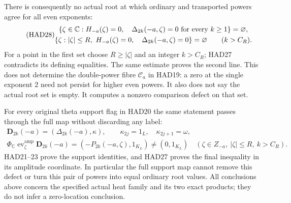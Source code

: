 There is consequently no actual root at which ordinary
and transported powers agree for all even exponents:
\begin{equation}\tag{HAD28}
\begin{gathered}
 \left\{\zeta\in\mathbb C:H_{-a}(\zeta)=0,\quad
          \Delta_{2k}(-a,\zeta)=0\ \hbox{for every }k\ge1\right\}
          =\varnothing,\\
 \left\{\zeta:|\zeta|\le R,\ H_{-a}(\zeta)=0,\quad
                \Delta_{2k}(-a,\zeta)=0\right\}
          =\varnothing\qquad(k>C_R).
\end{gathered}
\end{equation}
For a point in the first set choose $R\ge|\zeta|$ and
an integer $k>C_R$; HAD27 contradicts its defining
equalities. The same estimate proves the second line.
This does not determine the double-power fibre
$\mathscr C_a$ in HAD19: a zero at the single exponent
$2$ need not persist for higher even powers.
It also does not say the actual root set is empty.
It computes a nonzero comparison defect on that set.

For every original theta support flag in HAD20 the
same statement passes through the full map without
discarding any label:
\begin{equation}\tag{HAD29}
\begin{gathered}
 \mathbf D_{2k}(-a)=(\Delta_{2k}(-a),\kappa),\qquad
 \kappa_{2j}=1_L,\quad \kappa_{2j+1}=\omega,\\
 \Phi_{\mathbb C}\operatorname{ev}^{\mathrm{amp}}_\zeta
                           \mathbf D_{2k}(-a)
        =(-P_{2k}(-a,\zeta),1_{K_L})
                         \ne(0,1_{K_L})
       \quad(\zeta\in Z_{-a},\ |\zeta|\le R,\ k>C_R).
\end{gathered}
\end{equation}
HAD21--23 prove the support identities, and HAD27 proves
the final inequality in its amplitude coordinate.
In particular the full support map cannot remove this
defect or turn this pair of powers into equal
ordinary root values. All conclusions above concern
the specified actual heat family and its two exact
products; they do not infer a zero-location conclusion.

